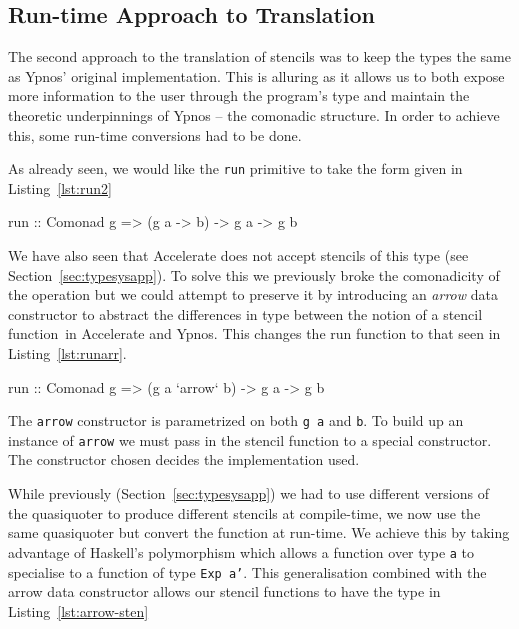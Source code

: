 \documentclass[
    12pt,
    a4paper,
    twoside,
    openright,
    ]{scrbook}
\begin{document}
\subsection{Run-time Approach to Translation}
\label{sec:runtimetrans}

The second approach to the translation of stencils was to keep the types the
same as Ypnos' original implementation.  This is alluring as it allows us to
both expose more information to the user through the program's type and maintain
the theoretic underpinnings of Ypnos -- the comonadic structure. In order to
achieve this, some run-time conversions had to be done.

As already seen, we would like the \texttt{run} primitive to take the
form given in Listing~\ref{lst:run2}

\begin{hflisting}[label={lst:run2}, caption=The comonadic run type. Changing the
  type of \texttt{g} could change the backend used.]
run :: Comonad g => (g a -> b) -> g a -> g b
\end{hflisting}

We have also seen that Accelerate does not accept stencils of this type (see
Section~\ref{sec:typesysapp}).  To solve this we previously broke the
comonadicity of the operation but we could attempt to preserve it by introducing
an \emph{arrow} data constructor to abstract the differences in type between the
notion of a stencil function\ in Accelerate and Ypnos. This changes the run
function to that seen in Listing~\ref{lst:runarr}.

\begin{hflisting}[label={lst:runarr}, caption=The type run is generalised to
  using the \texttt{arrow} type.]
run :: Comonad g => (g a `arrow` b) -> g a -> g b
\end{hflisting}

The \texttt{arrow} constructor is parametrized on both \texttt{g a} and
\texttt{b}. To build up an instance of \texttt{arrow} we must pass in the
stencil function to a special constructor. The constructor chosen decides the
implementation used.

While previously (Section~\ref{sec:typesysapp}) we had to use different versions
of the quasiquoter to produce different stencils at compile-time, we now use the
same quasiquoter but convert the function at run-time. We achieve this by taking
advantage of Haskell's polymorphism which allows a function over type \texttt{a}
to specialise to a function of type \texttt{Exp a'}. This generalisation
combined with the arrow data constructor allows our stencil functions to have
the type in Listing~\ref{lst:arrow-sten}
\end{document}
